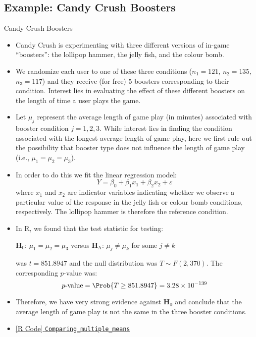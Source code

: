 \subsection{Example: Candy Crush Boosters}
\begin{Example}{Candy Crush Boosters}{}
      \begin{itemize}
            \item Candy Crush is experimenting with three different versions of
                  in-game ``boosters'': the lollipop hammer, the jelly fish, and the colour bomb.
            \item We randomize each user to one of these three conditions ($ n_1 = 121 $,
                  $ n_2 = 135 $, $ n_3 = 117$) and they
                  receive (for free) 5
                  boosters corresponding to their condition.
                  Interest lies in evaluating the effect
                  of these different boosters on the length of time a user plays the game.
            \item Let $ \mu_j $ represent the average length of game play
                  (in minutes) associated with booster condition
                  $ j = 1, 2, 3 $. While interest lies in finding the condition
                  associated with the longest average length
                  of game play, here we first rule out the possibility
                  that booster type does not influence the length
                  of game play (i.e., $ \mu_1=\mu_2=\mu_3 $).
            \item In order to do this we fit the linear regression model:
                  \[ Y=\beta_0+\beta_1 x_1+\beta_2 x_2+\varepsilon \]
                  where $ x_1 $ and $ x_2 $ are indicator variables indicating
                  whether we observe a particular value of the response in the
                  jelly fish or colour bomb conditions, respectively.
                  The lollipop hammer is therefore the reference condition.
            \item In R, we found that the test statistic for testing:
                  \begin{tightcenter}
                        $ \mathbf{H}_0 $: $ \mu_1=\mu_2=\mu_3 $ versus $ \mathbf{H}_\text{A} $: $ \mu_j\ne \mu_k $ for some $ j\ne k $
                  \end{tightcenter}
                  was $ t=851.8947 $ and the null distribution was $ T \sim F(2,370) $. The corresponding
                  $ p $-value was:
                  \[ p\text{-value}=\Prob{T\ge 851.8947}=3.28\times 10^{-139} \]
            \item Therefore, we have very strong evidence against $ \mathbf{H}_0 $ and conclude that the average
                  length of game play is not the same in the three booster conditions.
            \item \href{https://github.com/Hextical/university-notes/blob/master/year-3/semester-3/STAT 430/code/W3/Comparing_multiple_means.R}{[R Code] \texttt{Comparing\_multiple\_means}}
      \end{itemize}
\end{Example}
